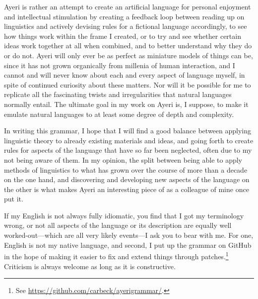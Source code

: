 Ayeri is rather an attempt to create an artificial language for personal 
enjoyment and intellectual stimulation by creating a feedback loop between 
reading up on linguistics and actively devising rules for a fictional language 
accordingly, to see how things work within the frame I created, or to try and 
see whether certain ideas work together at all when combined, and to better
understand why they do or do not. Ayeri will only ever be as perfect as 
miniature models of things can be, since it has not grown organically from 
millenia of human interaction, and I cannot and will never know about each and 
every aspect of language myself, in spite of continued curiosity about these 
matters. Nor will it be possible for me to replicate all the fascinating twists 
and irregularities that natural languages normally entail. The ultimate 
goal in my work on Ayeri is, I suppose, to make it emulate natural 
languages to at least some degree of depth and complexity.

In writing this grammar, I hope that I will find a good balance between 
applying linguistic theory to already existing materials and ideas, and going 
forth to create rules for aspects of the language that have so far been 
neglected, often due to my not being aware of them. In my opinion, the split 
between being able to apply methods of linguistics to what has grown over the 
course of more than a decade on the one hand, and discovering and developing 
new aspects of the language on the other is what makes Ayeri an interesting 
piece of  as a colleague of mine once put it.

If my English is not always fully idiomatic, you find that I got my terminology 
wrong, or not all aspects of the language or its description are equally well 
worked-out---which are all very likely events---I ask you to bear with me. For 
one, English is not my native language, and second, I put up the grammar on 
GitHub in the hope of making it easier to fix and extend things through 
patches.\footnote{See 
\href{https://github.com/carbeck/ayerigrammar}{https://github.com/carbeck/ayerigrammar/}.}
Criticism is always welcome as long as it is constructive.
